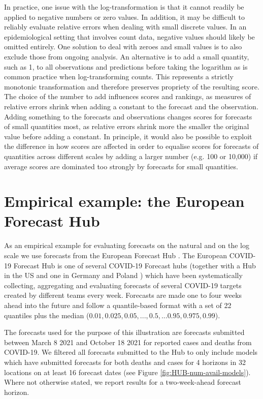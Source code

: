 \documentclass{article}
\begin{document}
In practice, one issue with the log-transformation is that it cannot readily be applied to negative numbers or zero values. In addition, it may be difficult to reliably evaluate relative errors when dealing with small discrete values. In an epidemiological setting that involves count data, negative values should likely be omitted entirely. One solution to deal with zeroes and small values is to also exclude those from ongoing analysis. An alternative is to add a small quantity, such as 1, to all observations and predictions before taking the logarithm as is common practice when log-transforming counts. This represents a strictly monotonic transformation and therefore preserves propriety of the resulting score. The choice of the number to add influences scores and rankings, as measures of relative errors shrink when adding a constant to the forecast and the observation. Adding something to the forecasts and observations changes scores for forecasts of small quantities most, as relative errors shrink more the smaller the original value before adding a constant. In principle, it would also be possible to exploit the difference in how scores are affected in order to equalise scores for forecasts of quantities across different scales by adding a larger number (e.g. 100 or 10,000) if average scores are dominated too strongly by forecasts for small quantities. 



\section{Empirical example: the European Forecast Hub}
\label{sec:results}

As an empirical example for evaluating forecasts on the natural and on the log scale we use forecasts from the European Forecast Hub \citep{europeancovid-19forecasthubEuropeanCovid19Forecast2021, sherrattPredictivePerformanceMultimodel2022}. 
The European COVID-19 Forecast Hub is one of several COVID-19 Forecast hubs (together with a Hub in the US \citep{cramerEvaluationIndividualEnsemble2021} and one in Germany and Poland \citep{bracherShorttermForecastingCOVID192021}) which have been systematically collecting, aggregating and evaluating forecasts of several COVID-19 targets created by different teams every week. Forecasts are made one to four weeks ahead into the future and follow a quantile-based format with a set of 22 quantiles plus the median ($0.01, 0.025, 0.05, ..., 0.5, ... 0.95, 0.975, 0.99$). 

The forecasts used for the purpose of this illustration are forecasts submitted between March 8 2021 and October 18 2021 for reported cases and deaths from COVID-19. We filtered all forecasts submitted to the Hub to only include models which have submitted forecasts for both deaths and cases for 4 horizons in 32 locations on at least 16 forecast dates (see Figure \ref{fig:HUB-num-avail-models}). Where not otherwise stated, we report results for a two-week-ahead forecast horizon. 
\end{document}
